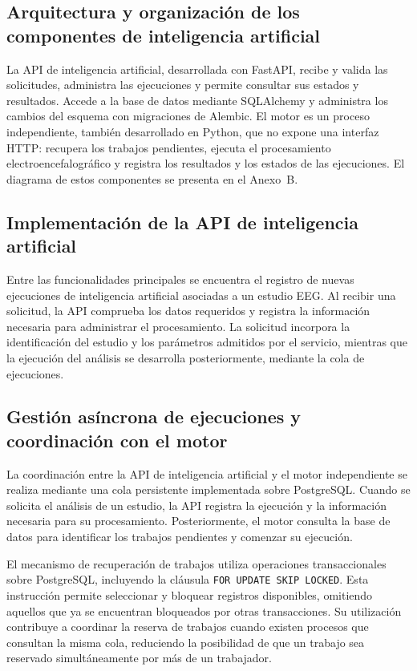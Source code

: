 \subsection{Arquitectura y organización de los componentes de inteligencia artificial}

\begin{nuevotextodos}
La API de inteligencia artificial, desarrollada con FastAPI, recibe y valida las solicitudes, administra las ejecuciones y permite consultar sus estados y resultados.
Accede a la base de datos mediante SQLAlchemy y administra los cambios del esquema con migraciones de Alembic.
El motor es un proceso independiente, también desarrollado en Python, que no expone una interfaz HTTP: recupera los trabajos pendientes, ejecuta el procesamiento electroencefalográfico y registra los resultados y los estados de las ejecuciones.
El diagrama de estos componentes se presenta en el Anexo~B.
\end{nuevotextodos}

\subsection{Implementación de la API de inteligencia artificial}

Entre las funcionalidades principales se
encuentra el registro de nuevas ejecuciones
de inteligencia artificial asociadas a un
estudio EEG. Al recibir una solicitud, la API
comprueba los datos requeridos y registra
la información necesaria para administrar
el procesamiento. La solicitud incorpora
la identificación del estudio y los parámetros
admitidos por el servicio, mientras que
la ejecución del análisis se desarrolla
posteriormente, mediante la cola de ejecuciones.

\subsection{Gestión asíncrona de ejecuciones y coordinación con el motor}

La coordinación entre la API de inteligencia
artificial y el motor independiente se realiza
mediante una cola persistente implementada
sobre PostgreSQL. Cuando se solicita el análisis
de un estudio, la API registra la ejecución
y la información necesaria para su procesamiento.
Posteriormente, el motor consulta la base
de datos para identificar los trabajos
pendientes y comenzar su ejecución.

El mecanismo de recuperación de trabajos
utiliza operaciones transaccionales sobre
PostgreSQL, incluyendo la cláusula
\texttt{FOR UPDATE SKIP LOCKED}. Esta
instrucción permite seleccionar y bloquear
registros disponibles, omitiendo aquellos
que ya se encuentran bloqueados por otras
transacciones. Su utilización contribuye
a coordinar la reserva de trabajos cuando
existen procesos que consultan la misma
cola, reduciendo la posibilidad de que
un trabajo sea reservado simultáneamente
por más de un trabajador.

